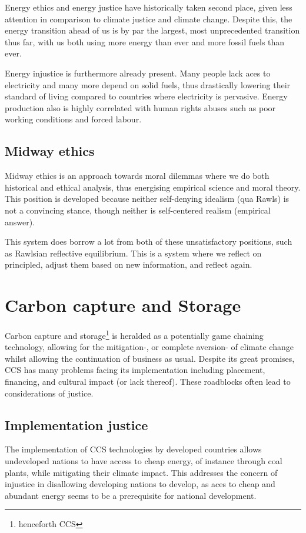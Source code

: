 \documentclass[12pt]{report}
\begin{document}
Energy ethics and energy justice have historically taken second place, given
less attention in comparison to climate justice and climate change. Despite
this, the energy transition ahead of us is by par the largest, most
unprecedented transition thus far, with us both using more energy than ever and
more fossil fuels than ever.

Energy injustice is furthermore already present. Many people lack aces to
electricity and many more depend on solid fuels, thus drastically lowering their
standard of living compared to countries where electricity is pervasive. Energy
production also is highly correlated with human rights abuses such as poor
working conditions and forced labour.

\section{Midway ethics}

Midway ethics is an approach towards moral dilemmas where we do both historical
and ethical analysis, thus energising empirical science and moral theory. This
position is developed because neither self-denying idealism (qua Rawls) is not a
convincing stance, though neither is self-centered realism (empirical answer).

This system does borrow a lot from both of these unsatisfactory positions, such
as Rawlsian reflective equilibrium. This is a system where we reflect on
principled, adjust them based on new information, and reflect again.

\chapter{Carbon capture and Storage}

Carbon capture and storage\footnote{henceforth CCS} is heralded as a potentially
game chaining technology, allowing for the mitigation-, or complete aversion- of
climate change whilst allowing the continuation of business as usual. Despite
its great promises, CCS has many problems facing its implementation including
placement, financing, and cultural impact (or lack thereof).  These roadblocks
often lead to considerations of justice.

\section{Implementation justice}

The implementation of CCS technologies by developed countries allows undeveloped
nations to have access to cheap energy, of instance through coal plants, while
mitigating their climate impact. This addresses the concern of injustice in
disallowing developing nations to develop, as aces to cheap and abundant energy
seems to be a prerequisite for national development.
\end{document}
